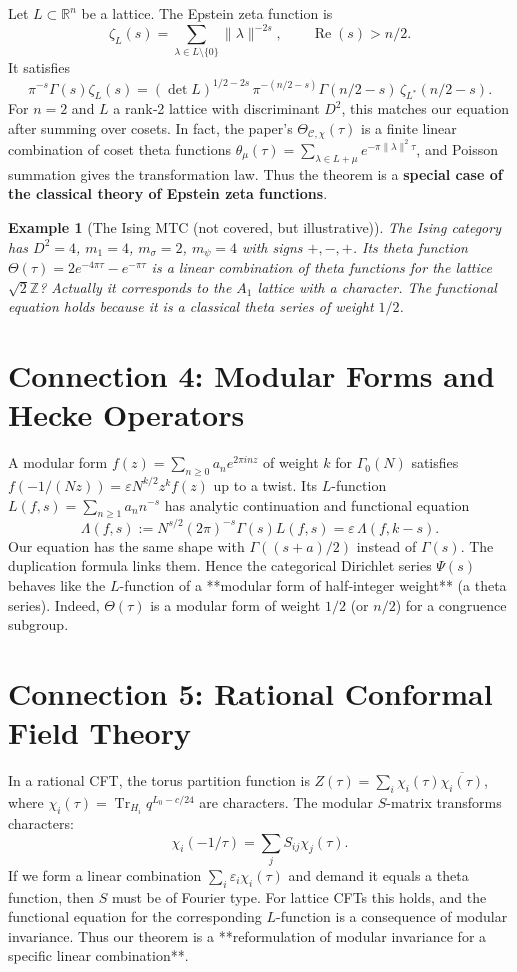 \documentclass[12pt,a4paper]{article}
\newtheorem{example}[theorem]{Example}
\theoremstyle{remark}
\begin{document}
Let $L\subset\mathbb{R}^n$ be a lattice. The Epstein zeta function is
\[
\zeta_L(s)=\sum_{\lambda\in L\setminus\{0\}}\|\lambda\|^{-2s},\qquad \operatorname{Re}(s)>n/2.
\]
It satisfies
\[
\pi^{-s}\Gamma(s)\zeta_L(s)=(\det L)^{1/2-2s}\,\pi^{-(n/2-s)}\Gamma(n/2-s)\,\zeta_{L^*}(n/2-s).
\]
For $n=2$ and $L$ a rank‑2 lattice with discriminant $D^2$, this matches our equation after summing over cosets. In fact, the paper’s $\Theta_{\mathcal{C},\chi}(\tau)$ is a finite linear combination of coset theta functions $\theta_\mu(\tau)=\sum_{\lambda\in L+\mu}e^{-\pi\|\lambda\|^2\tau}$, and Poisson summation gives the transformation law. Thus the theorem is a \textbf{special case of the classical theory of Epstein zeta functions}.

\begin{example}[The Ising MTC (not covered, but illustrative)]
  The Ising category has $D^2=4$, $m_1=4$, $m_\sigma=2$, $m_\psi=4$ with signs $+,-,+$. Its theta function $\Theta(\tau)=2e^{-4\pi\tau}-e^{-\pi\tau}$ is a linear combination of theta functions for the lattice $\sqrt{2}\mathbb{Z}$? Actually it corresponds to the $A_1$ lattice with a character. The functional equation holds because it is a classical theta series of weight $1/2$.
\end{example}

\section{Connection 4: Modular Forms and Hecke Operators}

A modular form $f(z)=\sum_{n\ge0}a_n e^{2\pi i nz}$ of weight $k$ for $\Gamma_0(N)$ satisfies $f(-1/(Nz)) = \varepsilon N^{k/2}z^k f(z)$ up to a twist. Its $L$-function $L(f,s)=\sum_{n\ge1}a_n n^{-s}$ has analytic continuation and functional equation
\[
\Lambda(f,s):=N^{s/2}(2\pi)^{-s}\Gamma(s)L(f,s)=\varepsilon\,\Lambda(f,k-s).
\]
Our equation has the same shape with $\Gamma((s+a)/2)$ instead of $\Gamma(s)$. The duplication formula links them. Hence the categorical Dirichlet series $\Psi(s)$ behaves like the $L$-function of a **modular form of half‑integer weight** (a theta series). Indeed, $\Theta(\tau)$ is a modular form of weight $1/2$ (or $n/2$) for a congruence subgroup.

\section{Connection 5: Rational Conformal Field Theory}

In a rational CFT, the torus partition function is $Z(\tau)=\sum_i \chi_i(\tau)\overline{\chi_i(\tau)}$, where $\chi_i(\tau)=\operatorname{Tr}_{H_i} q^{L_0-c/24}$ are characters. The modular $S$-matrix transforms characters:
\[
\chi_i(-1/\tau)=\sum_j S_{ij}\chi_j(\tau).
\]
If we form a linear combination $\sum_i \varepsilon_i \chi_i(\tau)$ and demand it equals a theta function, then $S$ must be of Fourier type. For lattice CFTs this holds, and the functional equation for the corresponding $L$-function is a consequence of modular invariance. Thus our theorem is a **reformulation of modular invariance for a specific linear combination**.
\end{document}

